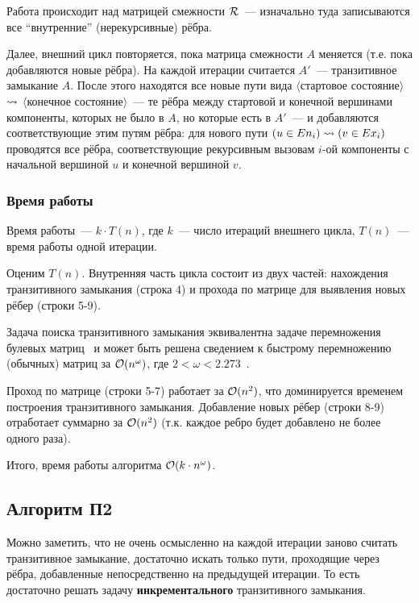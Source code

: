     Работа происходит над матрицей смежности $\mathcal{R}$~--- изначально туда записываются все ``внутренние'' (нерекурсивные) рёбра. 

    Далее, внешний цикл повторяется, пока матрица смежности $A$ меняется (т.е. пока добавляются новые рёбра). На каждой итерации считается $A'$~--- транзитивное замыкание $A$. После этого находятся все новые пути вида $\langle$стартовое состояние$\rangle$ $\rightsquigarrow$ $\langle$конечное состояние$\rangle$~--- те рёбра между стартовой и конечной вершинами компоненты, которых не было в $A$, но которые есть в $A'$~--- и добавляются соответствующие этим путям рёбра: для нового пути $(u \in En_i) \rightsquigarrow (v \in Ex_i)$ проводятся все рёбра, соответствующие рекурсивным вызовам $i$-ой компоненты с начальной вершиной $u$ и конечной вершиной $v$.

\subsubsection{Время работы}

    Время работы~--- $k \cdot T(n)$, где $k$~--- число итераций внешнего цикла, $T(n)$~--- время работы одной итерации. 

    Оценим $T(n)$. Внутренняя часть цикла состоит из двух частей: нахождения транзитивного замыкания (строка 4) и прохода по матрице для выявления новых рёбер (строки 5-9). 

    Задача поиска транзитивного замыкания эквивалентна задаче перемножения булевых матриц~\cite{Aho1974} и может быть решена сведением к быстрому перемножению (обычных) матриц за $\mathcal{O}(n^\omega)$, где $2 < \omega < 2.273$~\cite{Alman20}.

    Проход по матрице (строки 5-7) работает за $\mathcal{O}(n^2)$, что доминируется временем построения транзитивного замыкания. Добавление новых рёбер (строки 8-9) отработает суммарно за $\mathcal{O}(n^2)$ (т.к. каждое ребро будет добавлено не более одного раза).

    Итого, время работы алгоритма $\mathcal{O}(k \cdot n^{\omega})$.

\subsection{Алгоритм П2}

    Можно заметить, что не очень осмысленно на каждой итерации заново считать транзитивное замыкание, достаточно искать только пути, проходящие через рёбра, добавленные непосредственно на предыдущей итерации. То есть достаточно решать задачу {\bf инкрементального} транзитивного замыкания. 

